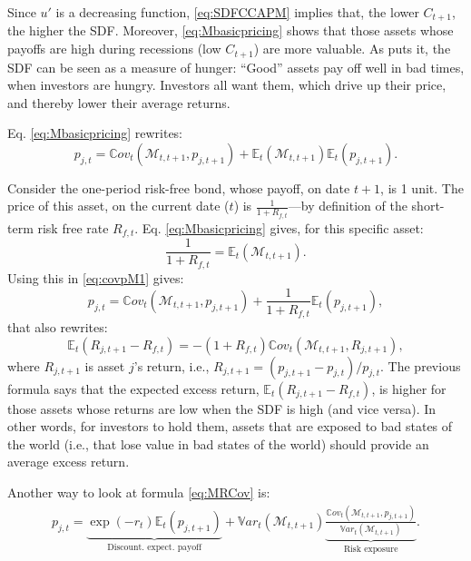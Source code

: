 \documentclass[
  12pt,
]{book}
\theoremstyle{definition}
\theoremstyle{definition}
\theoremstyle{definition}
\theoremstyle{definition}
\theoremstyle{remark}
\begin{document}
Since \(u'\) is a decreasing function, \eqref{eq:SDFCCAPM} implies that, the lower \(C_{t+1}\), the higher the SDF. Moreover, \eqref{eq:Mbasicpricing} shows that those assets whose payoffs are high during recessions (low \(C_{t+1}\)) are more valuable. As \citet{Cochrane_2005} puts it, the SDF can be seen as a measure of hunger: ``Good'' assets pay off well in bad times, when investors are hungry. Investors all want them, which drive up their price, and thereby lower their average returns.

Eq. \eqref{eq:Mbasicpricing} rewrites:
\begin{equation}
p_{j,t} = \mathbb{C}ov_t(\mathcal{M}_{t,t+1},p_{j,t+1}) +\mathbb{E}_t(\mathcal{M}_{t,t+1})\mathbb{E}_t(p_{j,t+1}).\label{eq:covpM1}
\end{equation}

Consider the one-period risk-free bond, whose payoff, on date \(t+1\), is 1 unit. The price of this asset, on the current date (\(t\)) is \(\frac{1}{1+R_{f,t}}\)---by definition of the short-term risk free rate \(R_{f,t}\). Eq. \eqref{eq:Mbasicpricing} gives, for this specific asset:
\[
\frac{1}{1+R_{f,t}} = \mathbb{E}_t(\mathcal{M}_{t,t+1}).
\]
Using this in \eqref{eq:covpM1} gives:
\begin{equation}
p_{j,t} = \mathbb{C}ov_t(\mathcal{M}_{t,t+1},p_{j,t+1}) +\frac{1}{1+R_{f,t}}\mathbb{E}_t(p_{j,t+1}),\label{eq:covpM2}
\end{equation}
that also rewrites:
\begin{equation}
\boxed{\mathbb{E}_t(R_{j,t+1} - R_{f,t}) = - (1 + R_{f,t}) \mathbb{C}ov_t(\mathcal{M}_{t,t+1},R_{j,t+1}),}\label{eq:MRCov}
\end{equation}
where \(R_{j,t+1}\) is asset \(j\)'s return, i.e., \(R_{j,t+1} = (p_{j,t+1} - p_{j,t})/p_{j,t}\). The previous formula says that the expected excess return, \(\mathbb{E}_t(R_{j,t+1} - R_{f,t})\), is higher for those assets whose returns are low when the SDF is high (and vice versa). In other words, for investors to hold them, assets that are exposed to bad states of the world (i.e., that lose value in bad states of the world) should provide an average excess return.

Another way to look at formula \eqref{eq:MRCov} is:
\begin{eqnarray*}
p_{j,t} = \underbrace{\exp(-r_t) \mathbb{E}_t(p_{j,t+1})}_{\mbox{Discount.  expect. payoff}} + \mathbb{V}ar_t(\mathcal{M}_{t,t+1}) \underbrace{\frac{\mathbb{C}ov_t(\mathcal{M}_{t,t+1},p_{j,t+1})}{\mathbb{V}ar_t(\mathcal{M}_{t,t+1})}}_{\mbox{Risk exposure}}.
\end{eqnarray*}
\end{document}
